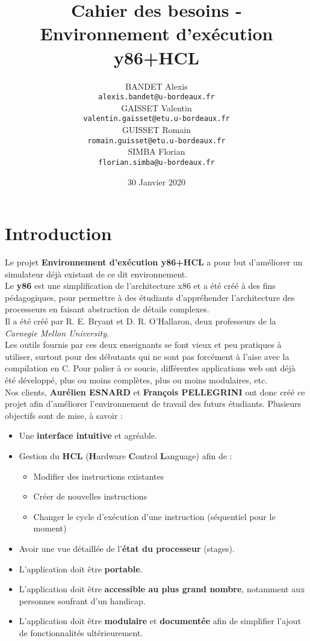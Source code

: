 \documentclass[french]{article}
\title{Cahier des besoins - Environnement d'exécution y86+HCL}
\author{
    BANDET Alexis \\
    \texttt{alexis.bandet@u-bordeaux.fr} \\
    GAISSET Valentin \\
    \texttt{valentin.gaisset@etu.u-bordeaux.fr} \\
    GUISSET Romain \\
    \texttt{romain.guisset@etu.u-bordeaux.fr} \\
    SIMBA Florian \\
    \texttt{florian.simba@u-bordeaux.fr} \\
}
\date{30 Janvier 2020}
\begin{document}
\maketitle
\newpage
\tableofcontents
\newpage

\section{Introduction}

Le projet \textbf{Environnement d'exécution y86+HCL} a pour but d'améliorer un simulateur déjà existant de ce dit environnement. \\

Le \textbf{y86} est une simplification de l'architecture x86 et a été créé à des fins pédagogiques, pour permettre à des étudiants d'appréhender l'architecture des processeurs en faisant abstraction de détails complexes. \\
Il a été créé par R. E. Bryant et D. R. O'Hallaron, deux professeurs de la \textit{Carnegie Mellon University}. \\

Les outils fournis par ces deux enseignants se font vieux et peu pratiques à utiliser, surtout pour des débutants qui ne sont pas forcément à l'aise avec la compilation en C. Pour palier à ce soucis, différentes applications web ont déjà été développé, plus ou moins complètes, plus ou moins modulaires, etc.\\

Nos clients, \textbf{Aurélien ESNARD} et \textbf{François PELLEGRINI} ont donc créé ce projet afin d'améliorer l'environnement de travail des futurs étudiants. Plusieurs objectifs sont de mise, à savoir : 

\begin{itemize}
    \item Une \textbf{interface intuitive} et agréable.
    \item Gestion du \textbf{HCL} (\textbf{H}ardware \textbf{C}ontrol \textbf{L}anguage) afin de :
    \begin{itemize}
        \item Modifier des instructions existantes
        \item Créer de nouvelles instructions
        \item Changer le cycle d'exécution d'une instruction (séquentiel pour le moment)
    \end{itemize}{}
    \item Avoir une vue détaillée de l'\textbf{état du processeur} (stages).
    \item L'application doit être \textbf{portable}.
    \item L'application doit être \textbf{accessible au plus grand nombre}, notamment aux personnes soufrant d'un handicap.
    \item L'application doit être \textbf{modulaire} et \textbf{documentée} afin de simplifier l'ajout de fonctionnalités ultérieurement.
\end{itemize}
\end{document}
